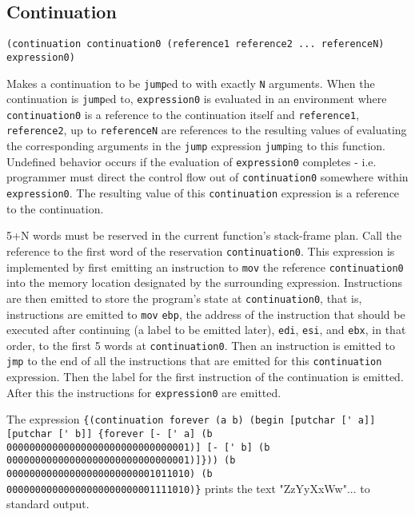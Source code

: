 \documentclass[twocolumn,landscape]{article}
\begin{document}
    \subsection{Continuation}\label{sec:continuation}
      \begin{lstlisting}
(continuation continuation0 (reference1 reference2 ... referenceN) expression0)
      \end{lstlisting}
      Makes a continuation to be \lstinline{jump}ed to with exactly \lstinline{N} arguments. When the continuation is \lstinline{jump}ed to, \lstinline{expression0} is evaluated in an environment where \lstinline{continuation0} is a reference to the continuation itself and \lstinline{reference1}, \lstinline{reference2}, up to \lstinline{referenceN} are references to the resulting values of evaluating the corresponding arguments in the \lstinline{jump} expression \lstinline{jump}ing to this function. Undefined behavior occurs if the evaluation of \lstinline{expression0} completes - i.e. programmer must direct the control flow out of \lstinline{continuation0} somewhere within \lstinline{expression0}. The resulting value of this \lstinline{continuation} expression is a reference to the continuation.

      5+N words must be reserved in the current function's stack-frame plan. Call the reference to the first word of the reservation \lstinline{continuation0}. This expression is implemented by first emitting an instruction to \lstinline{mov} the reference \lstinline{continuation0} into the memory location designated by the surrounding expression. Instructions are then emitted to store the program's state at \lstinline{continuation0}, that is, instructions are emitted to \lstinline{mov} \lstinline{ebp}, the address of the instruction that should be executed after continuing (a label to be emitted later), \lstinline{edi}, \lstinline{esi}, and \lstinline{ebx}, in that order, to the first 5 words at \lstinline{continuation0}. Then an instruction is emitted to \lstinline{jmp} to the end of all the instructions that are emitted for this \lstinline{continuation} expression. Then the label for the first instruction of the continuation is emitted. After this the instructions for \lstinline{expression0} are emitted.

      The expression \lstinline!{(continuation forever (a b) (begin [putchar [' a]] [putchar [' b]] {forever [- [' a] (b 00000000000000000000000000000001)] [- [' b] (b 00000000000000000000000000000001)]})) (b 00000000000000000000000001011010) (b 00000000000000000000000001111010)}! prints the text "ZzYyXxWw"... to standard output.
\end{document}

